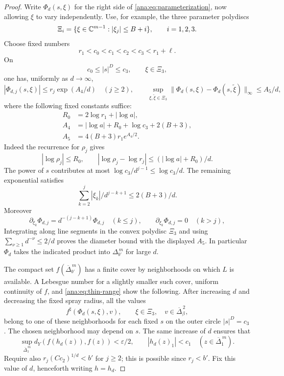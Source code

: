 \begin{proof}
Write \(\Phi_d(s,\xi)\) for the right side of
\eqref{ana:eq:parameterization}, now allowing \(\xi\) to vary
independently.  Use, for example, the three parameter polydiscs
\[
 \Xi_i=\{\xi\in\mathbb C^{m-1}:|\xi_j|\leq B+i\},\qquad i=1,2,3.
\]
Choose fixed numbers
\[
 r_1<c_0<c_1<c_2<c_3<r_1+\ell.
\]
On
\[
 c_0\leq |s|^D\leq c_3,\qquad \xi\in\Xi_3,
\]
one has, uniformly as \(d\to\infty\),
\begin{equation}\label{ana:eq:thin-range}
 |\Phi_{d,j}(s,\xi)|\leq r_j\exp(A_4/d)\quad(j\geq2),
 \qquad
 \sup_{\xi,\widetilde\xi\in\Xi_3}
 \|\Phi_d(s,\xi)-\Phi_d(s,\widetilde\xi)\|_\infty
       \leq A_5/d,
\end{equation}
where the following fixed constants suffice:
\[
 \begin{aligned}
 R_0&=2\log r_1+|\log a|,\\
 A_4&=|\log a|+R_0+\log c_3+2(B+3),\\
 A_5&=4(B+3)r_1e^{A_4/2}.
 \end{aligned}
\]
Indeed the recurrence for \(\rho_j\) gives
\[
 |\log\rho_j|\leq R_0,\qquad
 |\log\rho_j-\log r_j|
       \leq (|\log a|+R_0)/d .
\]
The power of \(s\) contributes at most
\(\log c_3/d^{j-1}\leq\log c_3/d\).  The remaining exponential
satisfies
\[
 \sum_{k=2}^j|\xi_k|/d^{j-k+1}\leq2(B+3)/d .
\]
Moreover
\[
 \partial_{\xi_k}\Phi_{d,j}
       =d^{-(j-k+1)}\Phi_{d,j}\quad(k\leq j),\qquad
 \partial_{\xi_k}\Phi_{d,j}=0\quad(k>j),
\]
Integrating along line segments in the convex polydisc \(\Xi_3\)
and using \(\sum_{\nu\geq1}d^{-\nu}\leq2/d\) proves the diameter
bound with the displayed \(A_5\).
In particular \(\Phi_d\) takes the indicated product into
\(\Delta_{b'}^{\,m}\) for large \(d\).

The compact set \(f(\overline\Delta_{b'}^{\,m})\) has a finite cover
by neighborhoods on which \(L\) is available.  A Lebesgue number
for a slightly smaller such cover, uniform continuity of \(f\),
and \eqref{ana:eq:thin-range} show the following.  After increasing
\(d\) and decreasing the fixed spray radius, all the values
\[
 f^\sharp(\Phi_d(s,\xi),v),\qquad \xi\in\Xi_3,\quad
 v\in\overline\Delta_{\beta}^{\,2},
\]
belong to one of these neighborhoods for each fixed \(s\) on the
outer circle \(|s|^D=c_3\).  The chosen neighborhood may depend
on \(s\).  The same increase of \(d\) ensures that
\[
 \sup_{\overline\Delta_1^{\,m}}d_Y(f(h_d(z)),f(z))
       <\varepsilon/2,\qquad
 |h_d(z)_1|<c_1\quad(z\in\overline\Delta_1^{\,m}).
\]
Require also \(r_j(Cc_2)^{1/d}<b'\) for \(j\geq2\); this
is possible since \(r_j<b'\).
Fix this value of \(d\), henceforth writing \(h=h_d\).


\end{proof}
